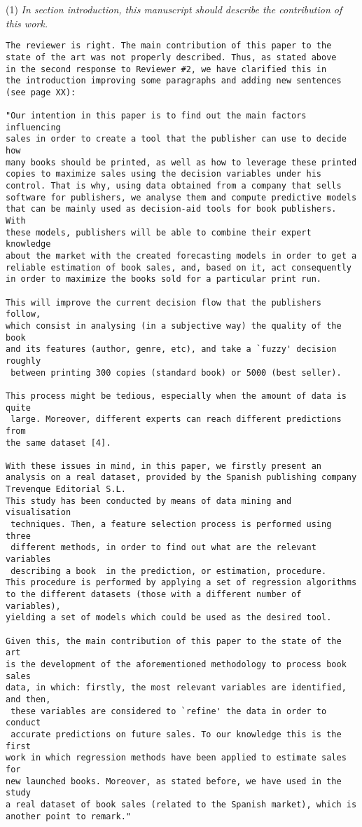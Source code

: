\documentclass[preprint]{elsarticle}
\begin{document}
\noindent (1) \emph{In section introduction, this manuscript should describe the contribution of this work. } 

\begin{verbatim}
The reviewer is right. The main contribution of this paper to the 
state of the art was not properly described. Thus, as stated above 
in the second response to Reviewer #2, we have clarified this in 
the introduction improving some paragraphs and adding new sentences 
(see page XX):

"Our intention in this paper is to find out the main factors influencing
sales in order to create a tool that the publisher can use to decide how 
many books should be printed, as well as how to leverage these printed
copies to maximize sales using the decision variables under his
control. That is why, using data obtained from a company that sells
software for publishers, we analyse them and compute predictive models 
that can be mainly used as decision-aid tools for book publishers. With 
these models, publishers will be able to combine their expert knowledge 
about the market with the created forecasting models in order to get a 
reliable estimation of book sales, and, based on it, act consequently 
in order to maximize the books sold for a particular print run. 

This will improve the current decision flow that the publishers follow, 
which consist in analysing (in a subjective way) the quality of the book 
and its features (author, genre, etc), and take a `fuzzy' decision roughly
 between printing 300 copies (standard book) or 5000 (best seller).

This process might be tedious, especially when the amount of data is quite
 large. Moreover, different experts can reach different predictions from 
the same dataset [4].

With these issues in mind, in this paper, we firstly present an 
analysis on a real dataset, provided by the Spanish publishing company 
Trevenque Editorial S.L.
This study has been conducted by means of data mining and visualisation
 techniques. Then, a feature selection process is performed using three
 different methods, in order to find out what are the relevant variables
 describing a book  in the prediction, or estimation, procedure. 
This procedure is performed by applying a set of regression algorithms 
to the different datasets (those with a different number of variables), 
yielding a set of models which could be used as the desired tool. 

Given this, the main contribution of this paper to the state of the art 
is the development of the aforementioned methodology to process book sales 
data, in which: firstly, the most relevant variables are identified, and then,
 these variables are considered to `refine' the data in order to conduct
 accurate predictions on future sales. To our knowledge this is the first 
work in which regression methods have been applied to estimate sales for 
new launched books. Moreover, as stated before, we have used in the study 
a real dataset of book sales (related to the Spanish market), which is 
another point to remark."

\end{verbatim}
\end{document}
